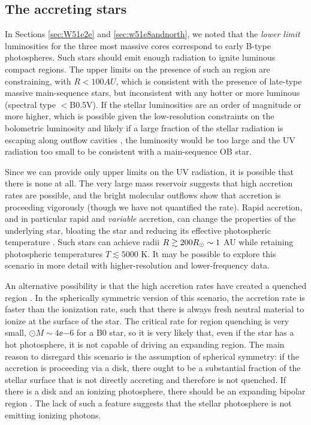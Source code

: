 \documentclass{emulateapj}
\begin{document}
\subsection{The accreting stars}
\label{sec:stellarproperties}
In Sections \ref{sec:W51e2e} and \ref{sec:w51e8andnorth}, we noted that the
\emph{lower limit} luminosities for the three most massive cores correspond to
early B-type photospheres.  Such stars should emit enough radiation to ignite
luminous compact \hii regions.%
The upper limits on the presence of such an \hii region are constraining, with
$R<100 AU$, which is consistent with the presence of late-type massive
main-sequence stars, but inconsistent with any hotter or more luminous
(spectral type $<$B0.5V).
If the stellar luminosities are an order of magnitude or more higher, which is
possible given the low-resolution constraints on the bolometric luminosity
\citep{Ginsburg2016a,Sievers1991a}
and likely if a large fraction of the stellar radiation is escaping along outflow
cavities \citep{Kuiper2012a,Zhang2013h}, the luminosity would be too large and
the UV radiation too small to be consistent with a main-sequence OB star.

Since we can provide only upper limits on the UV radiation, it is possible that
there is none at all.  The very large mass reservoir suggests that high
accretion rates are possible, and the bright molecular outflows show that
accretion is proceeding vigorously (though we have not quantified the rate).
Rapid accretion, and in particular rapid and \emph{variable} accretion, can
change the properties of the underlying star, bloating the star and reducing
its effective photospheric temperature \citep{Hosokawa2009a, Smith2012h,
Hosokawa2016a}.  Such stars can achieve radii $R\gtrsim200 R_{\odot} \sim 1$ AU
while retaining photospheric temperatures $T\lesssim5000$ K.  It may be
possible to explore this scenario in more detail with higher-resolution and
lower-frequency data.

An alternative possibility is that the high accretion rates have created
a quenched \hii region \citep{Walmsley1995b,Osorio1999a,Keto2006a}.
In the spherically symmetric version of this scenario, the accretion rate
is faster than the ionization rate, such that there is always fresh neutral
material to ionize at the surface of the star.  The critical rate for
\hii region quenching is very small, $\odot{M} \sim 4\ee{-6}$ \msun \peryr
for a B0 star, so it is very likely that, even if the star has a hot
photosphere, it is not capable of driving an expanding \hii region.
The main reason to disregard this scenario is the assumption of spherical
symmetry: if the accretion is proceeding via a disk, there ought to be a
substantial fraction of the stellar surface that is not directly accreting and
therefore is not quenched.  If there is a disk and an ionizing photosphere,
there should be an expanding bipolar \hii region \citep{Keto2006a}. 
The lack of such a feature suggests that the stellar photosphere is not 
emitting ionizing photons.
\end{document}
